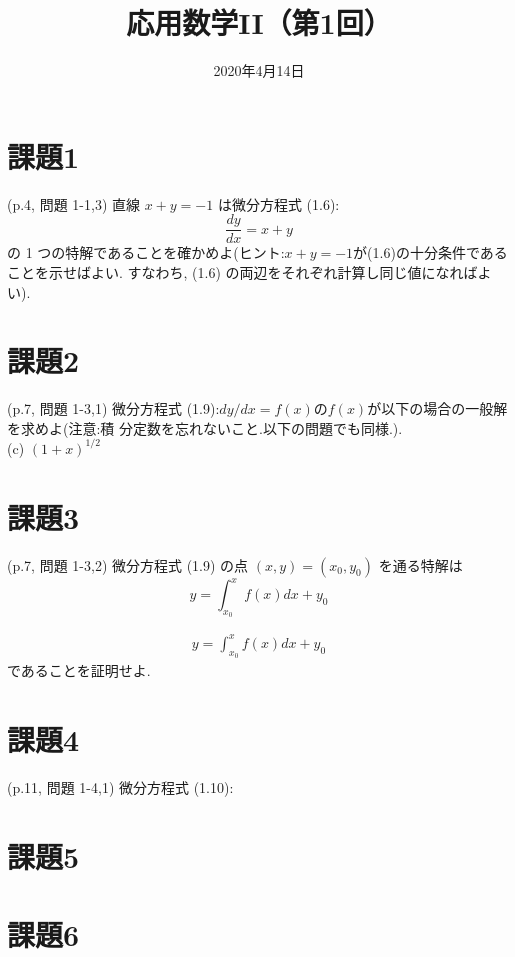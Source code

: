 \documentclass{ltjsarticle}
\title{応用数学II（第1回）}
\date{2020年4月14日}
\begin{document}
\maketitle
\section*{課題1}
 (p.4, 問題 1-1,3) 直線 $x + y = −1$ は微分方程式 (1.6):
$$
    \frac{dy}{dx}=x+y
$$
の 1 つの特解であることを確かめよ(ヒント:$x+y=-1$が(1.6)の十分条件であることを示せばよい. すなわち, (1.6) の両辺をそれぞれ計算し同じ値になればよい).
\section*{課題2}
 (p.7, 問題 1-3,1) 微分方程式 (1.9):$dy/dx = f (x) $の$ f (x) $が以下の場合の一般解を求めよ(注意:積 分定数を忘れないこと.以下の問題でも同様.).\\
(c) $(1+x)^{1/2}$
\section*{課題3}
 (p.7, 問題 1-3,2) 微分方程式 (1.9) の点 $(x, y) = (x_0, y_0)$ を通る特解は
$$
    y=\int_{x_0}^xf(x)dx+y_0
$$

\begin{align}
    y=\int_{x_0}^xf(x)dx+y_0
\end{align}
であることを証明せよ.
\section*{課題4}
 (p.11, 問題 1-4,1) 微分方程式 (1.10):

\section*{課題5}
\section*{課題6}
\end{document}
